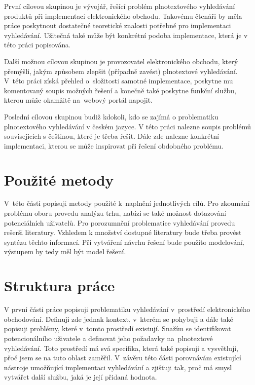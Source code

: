 \documentclass[FM,DP]{tulthesis}
\begin{document}
První cílovou skupinou je vývojář, řešící problém plnotextového vyhledávání produktů 
při implementaci elektronického obchodu. Takovému čtenáři by měla práce poskytnout dostatečné
teoretické znalosti potřebné pro implementaci vyhledávání. Užitečná také může být konkrétní
podoba implementace, která je v této práci popisována.

Další možnou cílovou skupinou je provozovatel elektronického obchodu, který přemýšlí, 
jakým způsobem zlepšit (případně zavést) plnotextové vyhledávání. V~této práci získá 
přehled o~složitosti samotné implementace, poskytne mu komentovaný soupis možných řešení 
a konečně také poskytne funkční službu, kterou může okamžitě na~webový portál napojit.

Poslední cílovou skupinou budiž kdokoli, kdo se zajímá o problematiku plnotextového 
vyhledávání v českém jazyce. V této práci nalezne soupis problémů souvisejicích s češtinou, 
které je třeba řešit. Dále zde nalezne konkrétní implementaci, kterou se může inspirovat 
při řešení obdobného problému.

\section{Použité metody}

V~této části popisuji metody použité k~naplnění jednotlivých cílů. Pro zkoumání problému
oboru provedu analýzu trhu, nabízí se také možnost dotazování potenciálních uživatelů.
Pro porozumnění problematice vyhledávání provedu rešerši literatury. Vzhledem k množství
dostupné literatury bude třeba provést syntézu těchto informací. Při vytváření 
návrhu řešení bude použito modelování, výstupem by tedy měl být model řešení. 

\section{Struktura práce}

V první části práce popisuji problematiku vyhledávání v~prostředí elektronického obchodování. 
Definuji zde jednak kontext, v~kterém se pohybuji a dále také popisuji problémy, 
které v~tomto prostředí existují. Snažím se identifikovat potencionálního uživatele 
a definovat jeho požadavky na~plnotextové vyhledávání. Toto prostředí má svá specifika, 
která také popisuji a vysvětluji, přoč jsem se na tuto oblast zaměřil. V~závěru této části porovnávám
existující nástroje umožňující implementaci vyhledávání a zjišťuji tak, proč má smysl
vytvářet další službu, jaká je její přidaná hodnota.
\end{document}
